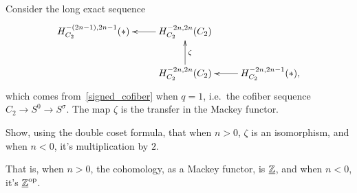 Consider the long exact sequence
\[\xymatrix{
	H_{C_2}^{-(2n-1), 2n-1}(*) & H_{C_2}^{-2n,2n}(C_2)\ar[l]\\
	& H_{C_2}^{-2n,2n}(C_2)\ar[u]_\zeta & H_{C_2}^{-2n,2n-1}(*),\ar[l]
}\]
which comes from~\eqref{signed_cofiber} when $q = 1$, i.e.\ the cofiber sequence $C_2\to S^0\to S^\sigma$. The map
$\zeta$ is the transfer in the Mackey functor.
\begin{ex}
Show, using the double coset formula, that when $n > 0$, $\zeta$ is an isomorphism, and when $n < 0$, it's
multiplication by $2$.
\end{ex}
That is, when $n > 0$, the cohomology, as a Mackey functor, is $\underline{\mathbb Z}$, and when $n < 0$, it's
$\underline{\mathbb Z}^{\mathrm{op}}$.
